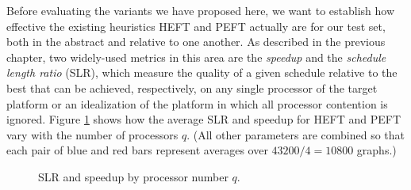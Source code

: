 \documentclass[12pt]{article}
\begin{document}
Before evaluating the variants we have proposed here, we want to establish how effective the existing heuristics HEFT and PEFT actually are for our test set, both in the abstract and relative to one another. As described in the previous chapter, two widely-used metrics in this area are the {\em speedup} and the {\em schedule length ratio} (SLR), which measure the quality of a given schedule relative to the best that can be achieved, respectively, on any single processor of the target platform or an idealization of the platform in which all processor contention is ignored. Figure \ref{plot.bench_slr_speedup} shows how the average SLR and speedup for HEFT and PEFT vary with the number of processors $q$. (All other parameters are combined so that each pair of blue and red bars represent averages over $43200/4 = 10800$ graphs.)  

\begin{figure}
	\centering	
	\caption{SLR and speedup by processor number $q$.}	
	\label{plot.bench_slr_speedup} 
      \end{figure}
\end{document}
